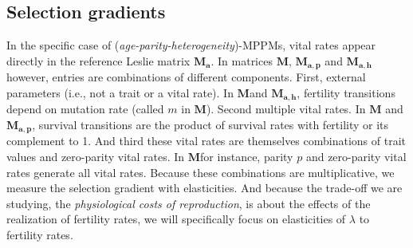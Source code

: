 \documentclass[10pt,a4paper]{article}
\newcommand{\M}{$\mathbf{M}$}
\begin{document}

\subsection{Selection gradients} 
In the specific case of (\emph{age-parity-heterogeneity})-MPPMs, vital rates appear directly in the reference Leslie matrix $\mathbf{M_{a}}$. In  matrices $\mathbf{M}$, $\mathbf{M_{a,p}}$ and $\mathbf{M_{a,h}}$ however,  entries are combinations of different components. First, external  parameters (i.e., not a trait or a vital rate). In \M and $\mathbf{M_{a,h}}$, fertility transitions depend on mutation rate (called $m$ in \M). Second multiple vital rates. In $\mathbf{M}$ and $\mathbf{M_{a,p}}$, survival transitions are the product of survival rates with fertility or its complement to 1. And third these vital rates are themselves combinations of trait values and zero-parity vital rates. In \M for instance, parity $p$ and zero-parity vital rates generate all vital rates. Because these combinations are multiplicative, we measure the selection gradient with elasticities. And because the trade-off we are studying, the \textit{physiological costs of reproduction}, is about the effects of the realization of fertility rates,  we will specifically focus on elasticities of $\lambda$ to fertility rates. \\
\end{document}
